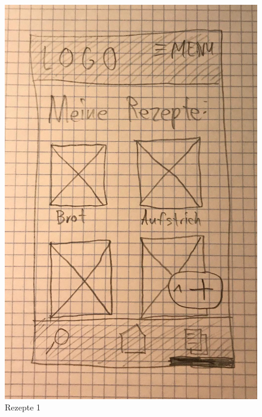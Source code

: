 \begin{figure}[H]
  \includegraphics[width=\linewidth]{./exercise13/Rezepte1.jpeg}
  \caption{Rezepte 1}
\end{figure}

